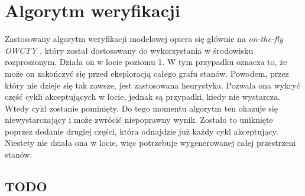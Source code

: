 \chapter{Algorytm weryfikacji}

Zastosowany algorytm weryfikacji modelowej opiera się głównie na \textit{on-the-fly OWCTY} \cite{Bar12}, który został dostosowany do wykorzystania w środowisku rozproszonym.
Działa on w locie poziomu 1.
W tym przypadku oznacza to, że może on zakończyć się przed eksploracją całego grafu stanów.
Powodem, przez który nie dzieje się tak zawsze, jest zastosowana heurystyka.
Pozwala ona wykryć część cykli akceptujących w locie, jednak są przypadki, kiedy nie wystarcza.
Wtedy cykl zostanie pominięty.
Do tego momentu algorytm ten okazuje się niewystarczający i może zwrócić niepoprawny wynik.
Zostało to uniknięte poprzez dodanie drugiej części, która odnajdzie już każdy cykl akceptujący.
Niestety nie działa ona w locie, więc potrzebuje wygenerowanej całej przestrzeni stanów.


\section{TODO}

\def \noderadius {1.2cm}
\def \noderadiuspt {0.6}
\def \radius {1.5}
\def \marginangle {30}



